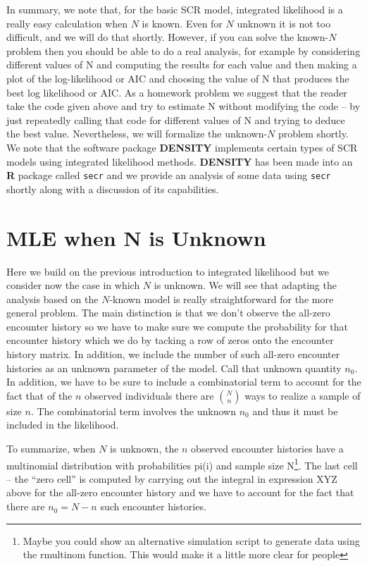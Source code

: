 In summary, we note that, for the basic SCR model, integrated
likelihood is a really easy calculation when $N$ is known. Even for $N$
unknown it is not too difficult, and we will do that shortly.
However, if you can solve the known-$N$ problem then you should be able
to do a real analysis, for example by considering different values of
N and computing the results for each value and then making a plot of
the log-likelihood or AIC and choosing the value of N that produces
the best log likelihood or AIC. As a homework problem we suggest that
the reader take the code given above and try to estimate N without
modifying the code – by just repeatedly calling that code for
different values of N and trying to deduce the best value.
Nevertheless, we will formalize the unknown-$N$ problem shortly.  We
note that the software package {\bf DENSITY} \citep{efford_etal:2004} implements
certain types of SCR models using integrated likelihood methods.
{\bf DENSITY} has been made into an {\bf R} package called \mbox{\tt secr} \citep{efford:2011}
and we provide an analysis of some data using \mbox{\tt secr} shortly along
with a discussion of its capabilities.


\section{MLE when N is Unknown} 

Here we build on the previous introduction to integrated likelihood
but we consider now the case in which $N$ is unknown. We will see that
adapting the analysis based on the $N$-known model is really
straightforward for the more general problem. The main distinction is
that we don’t observe the all-zero encounter history so we have to
make sure we compute the probability for that encounter history which
we do by tacking a row of zeros onto the encounter history matrix. In
addition, we include the number of such all-zero encounter histories
as an unknown parameter of the model. Call that unknown quantity $n_{0}$.
In addition, we have to be sure to include a combinatorial term to
account for the fact that of the $n$ observed individuals there are
${N \choose n}$
 ways to realize a sample of size $n$. The combinatorial term
involves the unknown $n_{0}$ and thus it must be included in the likelihood.

To summarize, when $N$ is unknown, the $n$ observed encounter histories
have a multinomial distribution with probabilities pi(i) and sample
size N\footnote{ Maybe you could show an alternative simulation script
  to generate data using the rmultinom function. This would make it a
  little more clear for people}. The last cell – the ``zero cell'' is
computed by carrying out the integral in expression XYZ above for the
all-zero encounter history and we have to account for the fact that
there are $n_{0} = N-n$ such encounter histories.

